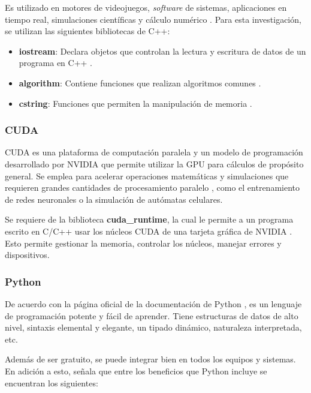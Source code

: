 Es utilizado en motores de videojuegos, \textit{software} de sistemas, aplicaciones en tiempo real, simulaciones científicas y cálculo numérico \cite{msmk2025_c}. Para esta investigación, se utilizan las siguientes bibliotecas de C++:

\begin{itemize}
	\item \textbf{iostream}: Declara objetos que controlan la lectura y escritura de datos de un programa en C++ \cite{microsoft2025_iostream}.
	
	\item \textbf{algorithm}: Contiene funciones que realizan algoritmos comunes \cite{microsoft2025_algorithm}.
	
	\item \textbf{cstring}: Funciones que permiten la manipulación de memoria \cite{microsoft2024_cstring}.
\end{itemize}

\subsubsection{CUDA}

CUDA es una plataforma de computación paralela y un modelo de programación desarrollado por NVIDIA que permite utilizar la GPU para cálculos de propósito general. Se emplea para acelerar operaciones matemáticas y simulaciones que requieren grandes cantidades de procesamiento paralelo \cite{cuda}, como el entrenamiento de redes neuronales o la simulación de autómatas celulares.

Se requiere de la biblioteca \textbf{cuda\_runtime}, la cual le permite a un programa escrito en C/C++ usar los núcleos CUDA de una tarjeta gráfica de NVIDIA \cite{cuda_runtime}. Esto permite gestionar la memoria, controlar los núcleos, manejar errores y dispositivos.

\subsubsection{Python}

De acuerdo con la página oficial de la documentación de Python \cite{pythonTutorial}, es un lenguaje de programación potente y fácil de aprender. Tiene estructuras de datos de alto nivel, sintaxis elemental y elegante, un tipado dinámico, naturaleza interpretada, etc. 

Además de ser gratuito, se puede integrar bien en todos los equipos y sistemas. En adición a esto, \cite{awsPython} señala que entre los beneficios que Python incluye se encuentran los siguientes:

